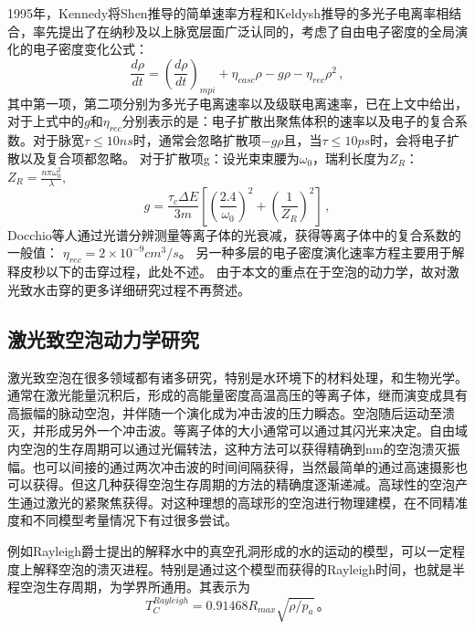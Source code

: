 1995年，Kennedy\cite{kennedy_first-order_1995}将Shen\cite{shen_principles_2003}推导的简单速率方程和Keldysh\cite{fedorov_l_2016}推导的多光子电离率相结合，率先提出了在纳秒及以上脉宽层面广泛认同的，考虑了自由电子密度的全局演化的电子密度变化公式：
$$\frac{d\rho}{dt}=(\frac{d\rho}{dt})_{mpi}+\eta_{casc}\rho-g\rho-\eta_{rec}\rho^2\,,$$
其中第一项，第二项分别为多光子电离速率以及级联电离速率，已在上文中给出，对于上式中的$g$和$\eta_{rec}$分别表示的是：电子扩散出聚焦体积的速率以及电子的复合系数。对于脉宽$\tau\le10ns$时，通常会忽略扩散项$-g\rho$\cite{mlejnek_dynamic_1998,jarnac_whole_2014}且，当$\tau\le10ps$时，会将电子扩散以及复合项都忽略\cite{lenzner_femtosecond_1998,tien_short-pulse_1999}。
对于扩散项g：设光束束腰为$\omega_0$，瑞利长度为$Z_R$：$Z_R=\frac{n\pi\omega_0^2}{\lambda}$,$$
g=\frac{\tau_c\Delta E}{3m}\left[\left(\frac{2.4}{\omega_0}\right)^2+\left(\frac{1}{Z_R}\right)^2\right]\,,$$
Docchio\cite{docchio_study_1988,noack_laser-induced_1999,docchio_spatial_1991}等人通过光谱分辨测量等离子体的光衰减，获得等离子体中的复合系数的一般值：
$\eta_{rec}=2\times10^{-9}cm^3/s$。
另一种多层的电子密度演化速率方程主要用于解释皮秒以下的击穿过程，此处不述。
由于本文的重点在于空泡的动力学，故对激光致水击穿的更多详细研究过程不再赘述。


\subsection{激光致空泡动力学研究}
激光致空泡在很多领域都有诸多研究，特别是水环境下的材料处理\cite{barcikowski_materials_2019}，和生物光学\cite{vogel_working_1990,juhasz_corneal_1999,toytman_multifocal_2010,jang_optothermally_2019}。通常在激光能量沉积后，形成的高能量密度高温高压的等离子体，继而演变成具有高振幅的脉动空泡\cite{47ee882c1e5b8fc9b161bae7598dafe099ccb01e}，并伴随一个演化成为冲击波的压力瞬态。空泡随后运动至溃灭，并形成另外一个冲击波\cite{liang_comprehensive_2022}。等离子体的大小通常可以通过其闪光来决定\cite{vogel_shock_1996}。自由域内空泡的生存周期可以通过光偏转法，这种方法可以获得精确到nm的空泡溃灭振幅。也可以间接的通过两次冲击波的时间间隔获得，当然最简单的通过高速摄影也可以获得。但这几种获得空泡生存周期的方法的精确度逐渐递减\cite{vogel_femtosecond-laser-induced_2008,schaffer_dynamics_2002}。高球性的空泡产生通过激光的紧聚焦获得\cite{venugopalan_role_2002,obreschkow_quest_2013}。对这种理想的高球形的空泡进行物理建模，在不同精准度和不同模型考量情况下有过很多尝试。

例如Rayleigh爵士提出的解释水中的真空孔洞形成的水的运动的模型，可以一定程度上解释空泡的溃灭进程\cite{rayleigh_viii_1917}。特别是通过这个模型而获得的Rayleigh时间，也就是半程空泡生存周期，为学界所通用。其表示为
$$T_C^{Rayleigh}=0.91468R_{max}\sqrt{\rho/p_a}\,。$$

